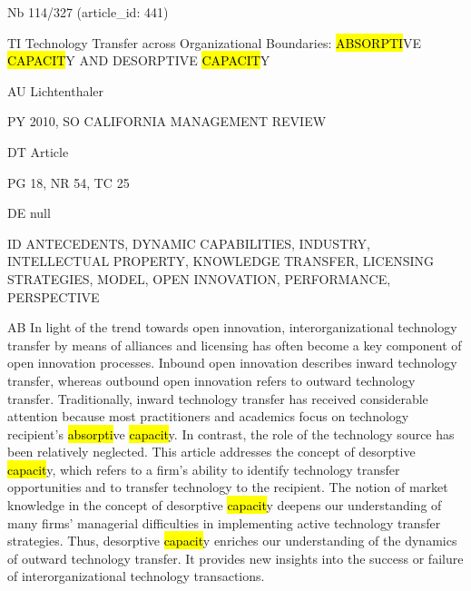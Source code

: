 \documentclass[a4paper]{article}
\begin{document}
\vspace*{-2cm}
Nb \tabto{0cm}114/327 (article\_id: 441)\par
TI \tabto{0cm}Technology Transfer across Organizational Boundaries: \hl{ABSORPTI}VE \hl{CAPACIT}Y AND DESORPTIVE \hl{CAPACIT}Y\par
AU \tabto{0cm}Lichtenthaler\par
PY \tabto{0cm}2010, SO CALIFORNIA MANAGEMENT REVIEW\par
DT \tabto{0cm}Article\par
PG \tabto{0cm}18, NR 54, TC 25\par
DE \tabto{0cm}null\par
ID \tabto{0cm}ANTECEDENTS, DYNAMIC CAPABILITIES, INDUSTRY, INTELLECTUAL PROPERTY, KNOWLEDGE TRANSFER, LICENSING STRATEGIES, MODEL, OPEN INNOVATION, PERFORMANCE, PERSPECTIVE\par
AB \tabto{0cm}In light of the trend towards open innovation, interorganizational technology transfer by means of alliances and licensing has often become a key component of open innovation processes. Inbound open innovation describes inward technology transfer, whereas outbound open innovation refers to outward technology transfer. Traditionally, inward technology transfer has received considerable attention because most practitioners and academics focus on technology recipient's \hl{absorpti}ve \hl{capacit}y. In contrast, the role of the technology source has been relatively neglected. This article addresses the concept of desorptive \hl{capacit}y, which refers to a firm's ability to identify technology transfer opportunities and to transfer technology to the recipient. The notion of market knowledge in the concept of desorptive \hl{capacit}y deepens our understanding of many firms' managerial difficulties in implementing active technology transfer strategies. Thus, desorptive \hl{capacit}y enriches our understanding of the dynamics of outward technology transfer. It provides new insights into the success or failure of interorganizational technology transactions.\par
\clearpage
\end{document}
